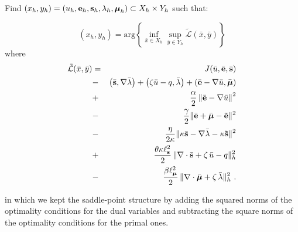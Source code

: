 \begin{tcolorbox}[colback=black!10!white, boxrule=0pt, halign=justify]
	\begin{problem*}[P2$_{h}$]
		Find $(x_h,y_h)=\left ( u_h, \mathbf{e}_h, \mathbf{s}_h, \lambda_h, \boldsymbol{\mu}_h\right ) \subset X_h\times Y_h$ such that:
		
		\begin{equation}
			(x_h,y_h)= \mbox{arg} \left \{ \inf_{\bar{x}\in X_h} \sup_{\bar{y}\in Y_h} 
			\tilde{\mathcal{L}}(\bar{x},\bar{y})
			\right \}
		\end{equation}
		where
		\begin{eqnarray}
			\tilde{\mathcal{L}}(\bar{x},\bar{y})&=&J(\bar{u},\bar{\mathbf{e}},\bar{\mathbf{s}}) \nonumber \\
			&-&\left ( \bar{\mathbf{s}},\nabla \bar{\lambda} \right ) + \left (\zeta \bar{u} - q , \bar{\lambda} \right )  
			+ \left ( \bar{\mathbf{e}}-\nabla \bar{u}, \bar{\boldsymbol{\mu}} \right ) \nonumber \\
			&+&\frac{\alpha}{2} \left \| \bar{\mathbf{e}} - \nabla \bar{u} \right \|^2 \nonumber \\
			&-&\frac{\gamma}{2} \|\bar{\mathbf{e}}+\bar{\boldsymbol{\mu}}-\mathbf{\tilde{e}}\|^2 \nonumber \\
			&-&\frac{\eta}{2\kappa} \|\kappa \bar{\mathbf{s}} - \nabla \bar{\lambda} - \kappa \mathbf{\tilde{s}}\|^2 \nonumber \\
			&+& \frac{\theta \kappa \ell_{\mathbf{s}}^2 }{2}\, \|\nabla \cdot \bar{\mathbf{s}} + \zeta\, \bar{u} - q \|_h^2 \nonumber \\
			&-& \frac{\beta \ell_{\boldsymbol{\mu}}^2 }{2}\, \|\nabla \cdot \bar{\boldsymbol{\mu}} + \zeta\, \bar{\lambda} \|_h^2~. \label{eq:discLag}
		\end{eqnarray}
	\end{problem*}
\end{tcolorbox}
\noindent
in which we kept the saddle-point structure by adding the squared norms of the optimality conditions for the dual variables and subtracting the square norms of the optimality conditions for the primal ones.

